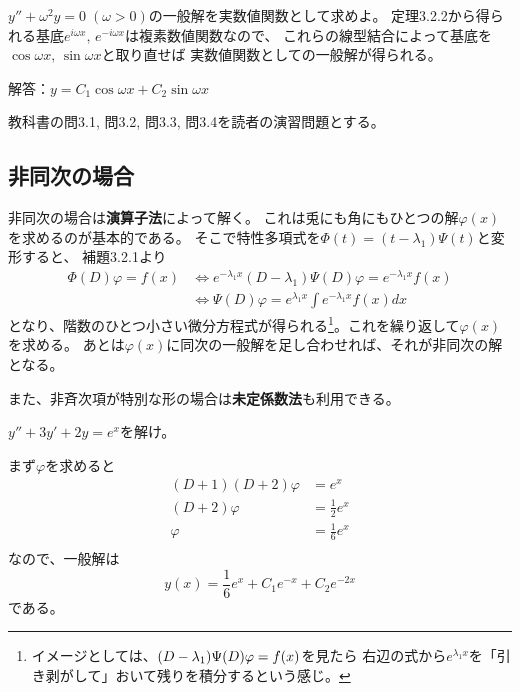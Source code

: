 \documentclass[report]{jlreq}
\begin{document}
\begin{problem}[教科書例題3.4]
    $y'' + \omega^2 y = 0\; (\omega > 0)$の一般解を実数値関数として求めよ。
    定理3.2.2から得られる基底$e^{i\omega x},\, e^{-i\omega x}$は複素数値関数なので、
    これらの線型結合によって基底を$\cos \omega x,\, \sin \omega x$と取り直せば
    実数値関数としての一般解が得られる。

    解答：$y = C_1 \cos \omega x + C_2 \sin \omega x$
\end{problem}

\begin{problem}
    教科書の問3.1, 問3.2, 問3.3, 問3.4を読者の演習問題とする。
\end{problem}


\subsection{非同次の場合}

非同次の場合は\textbf{演算子法}によって解く。
これは兎にも角にもひとつの解$\varphi(x)$を求めるのが基本的である。
そこで特性多項式を$\Phi(t) = (t - \lambda_1) \Psi(t)$と変形すると、
補題3.2.1より
\begin{equation}
    \begin{split}
        \Phi(D) \varphi = f(x)
            &\iff e^{-\lambda_1 x} (D - \lambda_1) \Psi(D) \varphi = e^{-\lambda_1 x} f(x) \\
            &\iff \Psi(D) \varphi = e^{\lambda_1 x} \int e^{-\lambda_1 x} f(x) dx
    \end{split}
\end{equation}
となり、階数のひとつ小さい微分方程式が得られる\footnote{
    イメージとしては、$(D - \lambda_1) \Psi(D) \varphi = f(x)$を見たら
    右辺の式から$e^{\lambda_1 x}$を「引き剥がして」おいて残りを積分するという感じ。
}。これを繰り返して$\varphi(x)$を求める。
あとは$\varphi(x)$に同次の一般解を足し合わせれば、それが非同次の解となる。

また、非斉次項が特別な形の場合は\textbf{未定係数法}も利用できる。

\begin{problem}[3.2.4]
    $y'' + 3y' + 2y = e^x$を解け。
\end{problem}

まず$\varphi$を求めると
\begin{equation}
    \begin{split}
        (D + 1)(D + 2) \varphi &= e^x \\
        (D + 2) \varphi &= \frac{1}{2} e^x \\
        \varphi &= \frac{1}{6} e^x \\
    \end{split}
\end{equation}
なので、一般解は
\begin{equation}
    y(x) = \frac{1}{6} e^x + C_1 e^{-x} + C_2 e^{-2x}
\end{equation}
である。
\end{document}
